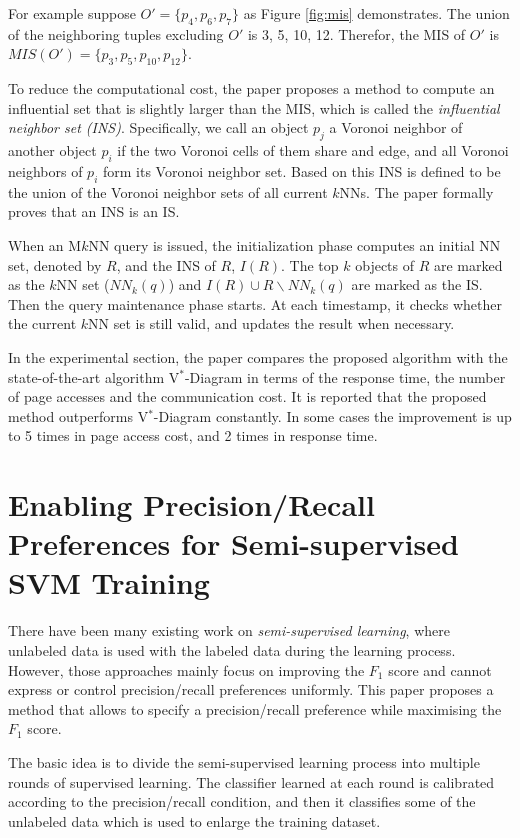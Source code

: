 \documentclass[paper=a4, fontsize=18pt]{article} %
\numberwithin{equation}{section} %
\numberwithin{figure}{section} %
\numberwithin{table}{section} %
\begin{document}
For example suppose $O' = \{p_4, p_6, p_7\}$ as Figure \ref{fig:mis} demonstrates. The union of the neighboring tuples excluding $O'$ is 3, 5, 10, 12. Therefor, the MIS of $O'$ is $MIS(O') = \{p_3, p_5, p_{10}, p_{12}\}$.

To reduce the computational cost, the paper proposes a method to compute an influential set that is slightly larger than the MIS, which is called the \emph{influential neighbor set (INS)}. Specifically, we call an object $p_j$ a Voronoi neighbor of another object $p_i$ if the two Voronoi cells of them share and edge, and all Voronoi neighbors of $p_i$ form its Voronoi neighbor set. Based on this INS is defined to be the union of the Voronoi neighbor sets of all current $k$NNs. The paper formally proves that an INS is an IS.

When an M$k$NN query is issued, the initialization phase computes an initial NN set, denoted by $R$, and the INS of $R$, $I(R)$. The top $k$ objects of $R$ are marked as the $k$NN set ($NN_k(q)$) and $I(R) \cup R \backslash NN_k(q)$ are marked as the IS. Then the query maintenance phase starts. At each timestamp, it checks whether the current $k$NN set is still valid, and updates the result when necessary.

In the experimental section, the paper compares the proposed algorithm with the state-of-the-art algorithm V$^*$-Diagram \cite{NZTK08} in terms of the response time, the number of page accesses and the communication cost. It is reported that the proposed method outperforms V$^*$-Diagram constantly. In some cases the improvement is up to  5 times in page access cost, and 2 times in response time.

\section{Enabling Precision/Recall Preferences for Semi-supervised SVM Training \cite{WZR14}}

There have been many existing work on \emph{semi-supervised learning},  where unlabeled data is used with the labeled data during the learning process. However, those approaches mainly focus on improving the $F_1$ score and cannot express or control precision/recall preferences uniformly. This paper proposes a method that allows to specify a precision/recall preference while maximising the $F_1$ score.

The basic idea is to divide the semi-supervised learning process into multiple rounds of supervised learning. The classifier learned at each round is calibrated according to the precision/recall condition, and then it classifies some of the unlabeled data which is used to enlarge the training dataset.
\end{document}
